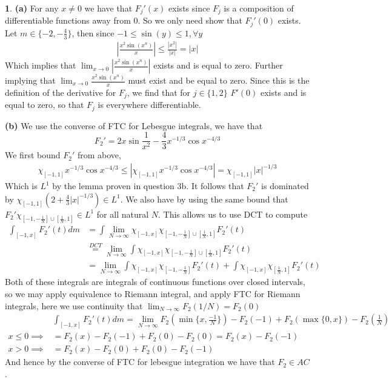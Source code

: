 \documentclass[10.5pt]{article}
\theoremstyle{definition}
\newtheorem{pb}{}
\newcommand{\set}[1]{\{#1\}}
\newcommand{\abs}[1]{\left\vert#1\right\vert}
\begin{document}
    \begin{pb}
        \textbf{(a)} For any \(x \neq 0\) we have that \(F_j'(x)\) exists since \(F_j\) is a composition of differentiable functions away from \(0\). So we only need show that \(F_j'(0)\) exists. Let \(m \in \set{-2,-\frac{4}{3}}\), then since \(-1 \leq \sin(y) \leq 1, \forall y\)
        \begin{align*}
            \abs{\frac{x^2\sin(x^n)}{x}} \leq \frac{\abs{x^2}}{\abs{x}} = \abs{x}
        \end{align*}
        Which implies that \(\lim_{x \to 0} \abs{\frac{x^2\sin(x^n)}{x}}\) exists and is equal to zero. Further implying that \(\lim_{x \to 0}\frac{x^2\sin(x^n)}{x}\) must exist and be equal to zero. Since this is the definition of the derivative for \(F_j\), we find that for \(j \in \set{1,2}\) \(F'(0)\) exists and is equal to zero, so that \(F_j\) is everywhere differentiable.

        \textbf{(b)} We use the converse of FTC for Lebesgue integrals, we have that
        \[F_2' = 2x\sin\frac{1}{x^2} - \frac{4}{3}x^{-1/3}\cos x^{-4/3}\]
        We first bound \(F_2'\) from above,
        \begin{align*}
            \chi_{[-1,1]}x^{-1/3}\cos x^{-4/3} \leq \abs{\chi_{[-1,1]}x^{-1/3}\cos x^{-4/3}} = \chi_{[-1,1]}\abs{x}^{-1/3}
        \end{align*}
        Which is \(L^1\) by the lemma proven in question 3b. It follows that \(F_2'\) is dominated by \(\chi_{[-1,1]}(2 + \frac{4}{3}\abs{x}^{-1/3}) \in L^1\). We also have by using the same bound that \(F_2'\chi_{[-1,-\frac{1}{N}]\cup[\frac{1}{N},1]} \in L^1\) for all natural \(N\). This allows us to use DCT to compute
        \begin{align*}
            \int_{[-1,x]} F_2'(t)dm &= \int \lim_{N\to\infty} \chi_{[-1,x]}\chi_{[-1,-\frac{1}{N}]\cup[\frac{1}{N},1]}F_2'(t) \\
            &\overset{DCT}{=} \lim_{N\to\infty} \int \chi_{[-1,x]}\chi_{[-1,-\frac{1}{N}]\cup[\frac{1}{N},1]}F_2'(t) \\
            &= \lim_{N \to \infty} \int \chi_{[-1,x]}\chi_{[-1,-\frac{1}{N}]}F_2'(t) + \int \chi_{[-1,x]}\chi_{[\frac{1}{N},1]}F_2'(t)
        \end{align*}
        Both of these integrals are integrals of continuous functions over closed intervals, so we may apply equivalence to Riemann integral, and apply FTC for Riemann integrals, here we use continuity that \(\lim_{N\to\infty}F_2(1/N) = F_2(0)\)
        \begin{align*}
            &\int_{[-1,x]} F_2'(t)dm 
            = \lim_{N\to\infty} F_2(\min\set{x,\frac{-1}{N}}) - F_2(-1) + F_2(\max\set{0,x}) - F_2(\frac{1}{N}) \\
            x \leq 0 \implies &= F_2(x) - F_2(-1) + F_2(0) - F_2(0) = F_2(x) - F_2(-1) \\
            x > 0 \implies &= F_2(x) - F_2(0) + F_2(0) - F_2(-1)
        \end{align*}
        And hence by the converse of FTC for lebesgue integration we have that \(F_2 \in AC\).
        


\end{pb}
\end{document}
